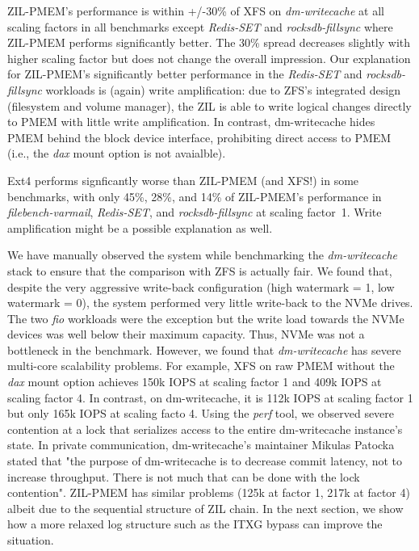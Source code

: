 \documentclass[12pt,a4paper,twoside]{book}
\begin{document}
ZIL-PMEM's performance is within +/-30\% of XFS on \textit{dm-writecache} at all scaling factors in all benchmarks except \textit{Redis-SET} and \textit{rocksdb-fillsync} where ZIL-PMEM performs significantly better.
The 30\% spread decreases slightly with higher scaling factor but does not change the overall impression.
Our explanation for ZIL-PMEM's significantly better performance in the \textit{Redis-SET} and \textit{rocksdb-fillsync} workloads is (again) write amplification:
due to ZFS's integrated design (filesystem and volume manager), the ZIL is able to write logical changes directly to PMEM with little write amplification.
In contrast, dm-writecache hides PMEM behind the block device interface, prohibiting direct access to PMEM (i.e., the \textit{dax} mount option is not avaialble).

Ext4 performs signficantly worse than ZIL-PMEM (and XFS!) in some benchmarks, with only 45\%, 28\%, and 14\% of ZIL-PMEM's performance in \textit{filebench-varmail}, \textit{Redis-SET}, and \textit{rocksdb-fillsync} at scaling factor~1.
Write amplification might be a possible explanation as well.

We have manually observed the system while benchmarking the \textit{dm-writecache} stack to ensure that the comparison with ZFS is actually fair.
We found that, despite the very aggressive write-back configuration (high watermark = 1, low watermark = 0), the system performed very little write-back to the NVMe drives.
The two \textit{fio} workloads were the exception but the write load towards the NVMe devices was well below their maximum capacity.
Thus, NVMe was not a bottleneck in the benchmark.
However, we found that \textit{dm-writecache} has severe multi-core scalability problems.
For example, XFS on raw PMEM without the \textit{dax} mount option achieves 150k IOPS at scaling factor 1 and 409k IOPS at scaling factor 4.
In contrast, on dm-writecache, it is 112k IOPS at scaling factor 1 but only 165k IOPS at scaling facto 4.
Using the \textit{perf} tool, we observed severe contention at a lock that serializes access to the entire dm-writecache instance's state.
In private communication, dm-writecache's maintainer Mikulas Patocka stated that "the purpose of dm-writecache is to decrease commit latency, not to increase throughput. There is not much that can be done with the lock contention".
ZIL-PMEM has similar problems (125k at factor 1, 217k at factor 4) albeit due to the sequential structure of ZIL chain.
In the next section, we show how a more relaxed log structure such as the ITXG bypass can improve the situation.
\end{document}
